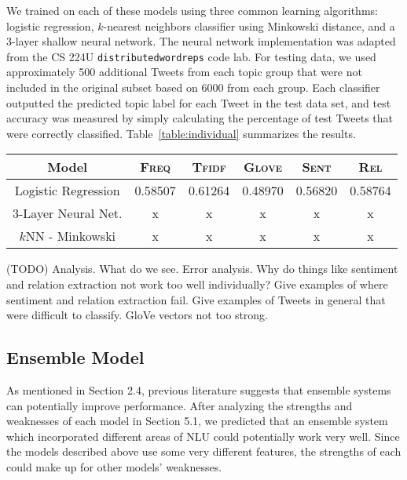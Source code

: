 \documentclass[11pt]{article}
\begin{document}
We trained on each of these models using three common learning algorithms: logistic regression, $k$-nearest neighbors classifier using Minkowski distance, and a 3-layer shallow neural network. The neural network implementation was adapted from the CS 224U \texttt{distributedwordreps} code lab. For testing data, we used approximately 500 additional Tweets from each topic group that were not included in the original subset based on 6000 from each group. Each classifier outputted the predicted topic label for each Tweet in the test data set, and test accuracy was measured by simply calculating the percentage of test Tweets that were correctly classified. Table~\ref{table:individual} summarizes the results.

\begin{table*}[h]
  \centering
  \begin{tabular}{|c||c|c|c|c|c|}
  \hline \textbf{Model} & \textsc{Freq} & \textsc{Tfidf} & \textsc{Glove} & \textsc{Sent} & \textsc{Rel} \\ \hline \hline
  Logistic Regression & 0.58507  & 0.61264  & 0.48970 & 0.56820 & 0.58764 \\ \hline
  3-Layer Neural Net. & x & x & x & x & x \\ \hline
  $k$NN - Minkowski  & x & x & x & x & x \\ \hline
  \end{tabular}
  \label{table:individual}
  \caption{Classification Accuracy for Individual Models}
\end{table*}

(TODO) Analysis. What do we see. Error analysis. Why do things like sentiment and relation extraction not work too well individually? Give examples of where sentiment and relation extraction fail. Give examples of Tweets in general that were difficult to classify. GloVe vectors not too strong.

\subsection{Ensemble Model}

As mentioned in Section 2.4, previous literature suggests that ensemble systems can potentially improve performance. After analyzing the strengths and weaknesses of each model in Section 5.1, we predicted that an ensemble system which incorporated different areas of NLU could potentially work very well. Since the models described above use some very different features, the strengths of each could make up for other models' weaknesses.
\end{document}
